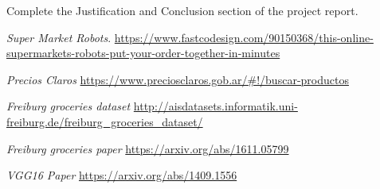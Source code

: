 \documentclass[a4paper,10pt]{article}
\begin{document}
Complete the Justification and Conclusion section of the project report. 


\begin{thebibliography}{9}
\textit{Super Market Robots}. 
\url{https://www.fastcodesign.com/90150368/this-online-supermarkets-robots-put-your-order-together-in-minutes} 

\textit{Precios Claros} 
\url{https://www.preciosclaros.gob.ar/\#!/buscar-productos}
 
\textit{Freiburg groceries dataset} 
\url{http://aisdatasets.informatik.uni-freiburg.de/freiburg\_groceries\_dataset/}

\textit{Freiburg groceries paper}
\url{https://arxiv.org/abs/1611.05799} 

\textit{VGG16 Paper}
\url{https://arxiv.org/abs/1409.1556}


\end{thebibliography}
 
\end{document}
